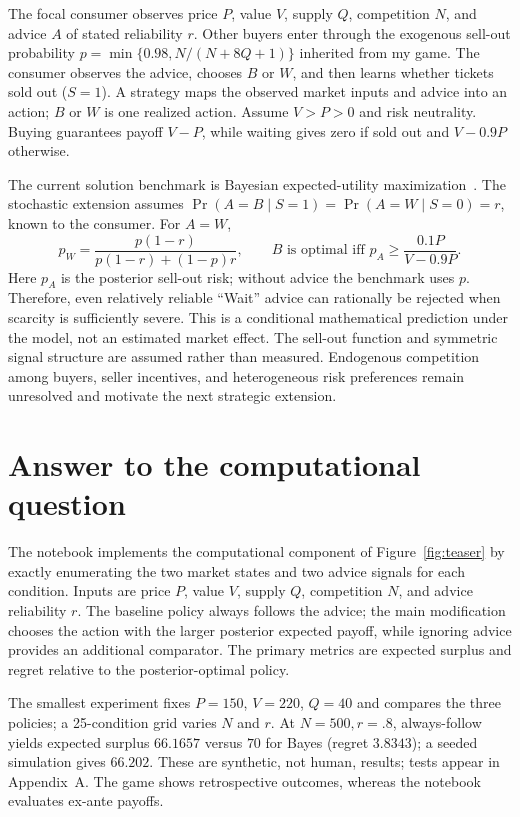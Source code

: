 The focal consumer observes price $P$, value $V$, supply $Q$, competition $N$, and advice $A$ of stated reliability $r$. Other buyers enter through the exogenous sell-out probability
$p=\min\{0.98,N/(N+8Q+1)\}$ inherited from my game. The consumer observes the advice, chooses $B$ or $W$, and then learns whether tickets sold out ($S=1$). A strategy maps the observed market inputs and advice into an action; $B$ or $W$ is one realized action. Assume $V>P>0$ and risk neutrality. Buying guarantees payoff $V-P$, while waiting gives zero if sold out and $V-0.9P$ otherwise.

The current solution benchmark is Bayesian expected-utility maximization~\cite{savage1972}. The stochastic extension assumes
$\Pr(A=B\mid S=1)=\Pr(A=W\mid S=0)=r$,
known to the consumer. For $A=W$,
\[
p_W=
\frac{p(1-r)}
{p(1-r)+(1-p)r},
\qquad
B \text{ is optimal iff }
p_A \geq
\frac{0.1P}{V-0.9P}.
\]
Here $p_A$ is the posterior sell-out risk; without advice the benchmark uses $p$. Therefore, even relatively reliable ``Wait'' advice can rationally be rejected when scarcity is sufficiently severe. This is a conditional mathematical prediction under the model, not an estimated market effect. The sell-out function and symmetric signal structure are assumed rather than measured. Endogenous competition among buyers, seller incentives, and heterogeneous risk preferences remain unresolved and motivate the next strategic extension.

\section{Answer to the computational question}

The notebook implements the computational component of Figure~\ref{fig:teaser} by exactly enumerating the two market states and two advice signals for each condition. Inputs are price $P$, value $V$, supply $Q$, competition $N$, and advice reliability $r$. The baseline policy always follows the advice; the main modification chooses the action with the larger posterior expected payoff, while ignoring advice provides an additional comparator. The primary metrics are expected surplus and regret relative to the posterior-optimal policy.

The smallest experiment fixes $P=150$, $V=220$, $Q=40$ and compares the three policies; a 25-condition grid varies $N$ and $r$. At $N=500,r=.8$, always-follow yields expected surplus $66.1657$ versus $70$ for Bayes (regret $3.8343$); a seeded simulation gives $66.202$. These are synthetic, not human, results; tests appear in Appendix~A. The game shows retrospective outcomes, whereas the notebook evaluates ex-ante payoffs.

